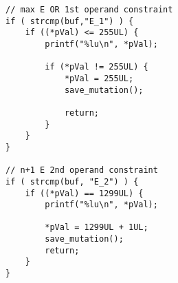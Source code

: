 
\begin{lstlisting}[style=CStyle, caption=Example of automatically generated ASN.1 data-driven mutation operations., label=ASN_mutations]
// max E OR 1st operand constraint
if ( strcmp(buf,"E_1") ) {                                                  
	if ((*pVal) <= 255UL) {                                                                                                               
	    printf("%lu\n", *pVal);

	    if (*pVal != 255UL) {
	        *pVal = 255UL;
	        save_mutation();

	        return;
	    }           
	}       
}

// n+1 E 2nd operand constraint
if ( strcmp(buf, "E_2") ) {
    if ((*pVal) == 1299UL) {                                                                                                              
        printf("%lu\n", *pVal);

        *pVal = 1299UL + 1UL;
        save_mutation();
        return;
    }       
} 
\end{lstlisting}